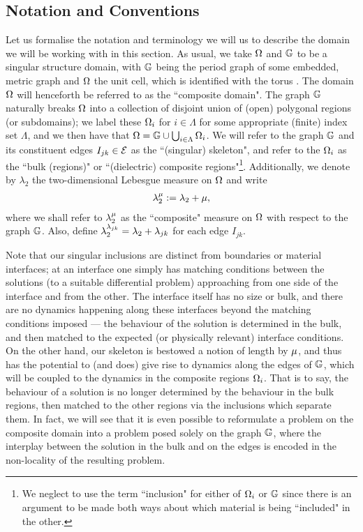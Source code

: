 \subsection{Notation and Conventions} \label{ssec:SINotation}
Let us formalise the notation and terminology we will us to describe the domain we will be working with in this section.
As usual, we take $\Omega$ and $\mathbb{G}$ to be a singular structure domain, with $\mathbb{G}$ being the period graph of some embedded, metric graph and $\Omega$ the unit cell, which is identified with the torus .
The domain $\Omega$ will henceforth be referred to as the ``composite domain".
The graph $\mathbb{G}$ naturally breaks $\Omega$ into a collection of disjoint union of (open) polygonal regions (or subdomains); we label these $\Omega_i$ for $i\in\Lambda$ for some appropriate (finite) index set $\Lambda$, and we then have that $\Omega = \mathbb{G}\cup\bigcup_{i\in\Lambda}\Omega_i$.
We will refer to the graph $\mathbb{G}$ and its constituent edges $I_{jk}\in\mathcal{E}$ as the ``(singular) skeleton", and refer to the $\Omega_i$ as the ``bulk (regions)" or ``(dielectric) composite regions"\footnote{We neglect to use the term ``inclusion" for either of $\Omega_i$ or $\mathbb{G}$ since there is an argument to be made both ways about which material is being ``included" in the other.}.
Additionally, we denote by $\lambda_2$ the two-dimensional Lebesgue measure on $\Omega$ and write
\begin{align*}
	\lambda_2^{\mu} := \lambda_2 + \mu,
\end{align*}
where we shall refer to $\lambda_2^{\mu}$ as the ``composite" measure on $\Omega$ with respect to the graph $\mathbb{G}$.
Also, define $\lambda_2^{\lambda_{jk}} = \lambda_2 + \lambda_{jk}$ for each edge $I_{jk}$.

Note that our singular inclusions are distinct from boundaries or material interfaces; at an interface one simply has matching conditions between the solutions (to a suitable differential problem) approaching from one side of the interface and from the other.
The interface itself has no size or bulk, and there are no dynamics happening along these interfaces beyond the matching conditions imposed --- the behaviour of the solution is determined in the bulk, and then matched to the expected (or physically relevant) interface conditions.
On the other hand, our skeleton is bestowed a notion of length by $\mu$, and thus has the potential to (and does) give rise to dynamics along the edges of $\mathbb{G}$, which will be coupled to the dynamics in the composite regions $\Omega_i$.
That is to say, the behaviour of a solution is no longer determined by the behaviour in the bulk regions, then matched to the other regions via the inclusions which separate them.
In fact, we will see that it is even possible to reformulate a problem on the composite domain into a problem posed solely on the graph $\mathbb{G}$, where the interplay between the solution in the bulk and on the edges is encoded in the non-locality of the resulting problem.

